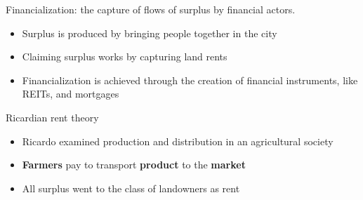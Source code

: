 \documentclass[]{beamer} %
\begin{document}
\begin{frame}{Financialization: 
the capture of flows of surplus by financial actors.}
\begin{itemize} \Large 
    \item Surplus is produced by bringing people together in the city 
    \item Claiming surplus works by capturing land rents %
    \item Financialization is achieved through the creation of financial instruments, like REITs, and mortgages 
\end{itemize}

\end{frame}

\begin{frame}
\begin{figure}[!ht]
\centering
\resizebox{0.85\textwidth}{!}{}
\label{fig:fieldsplus}
\end{figure}
\end{frame}

\begin{frame}{Ricardian rent theory}
\begin{itemize}\Large
    \item Ricardo examined production and distribution in an agricultural society
    \item \textbf{Farmers} pay to transport \textbf{product} to the \textbf{market}
    \item All surplus went to the class of landowners as rent
\end{itemize}
\begin{centering}  \vspace{0cm}\hspace{1cm} 
\end{centering}
\end{frame}
\end{document}

